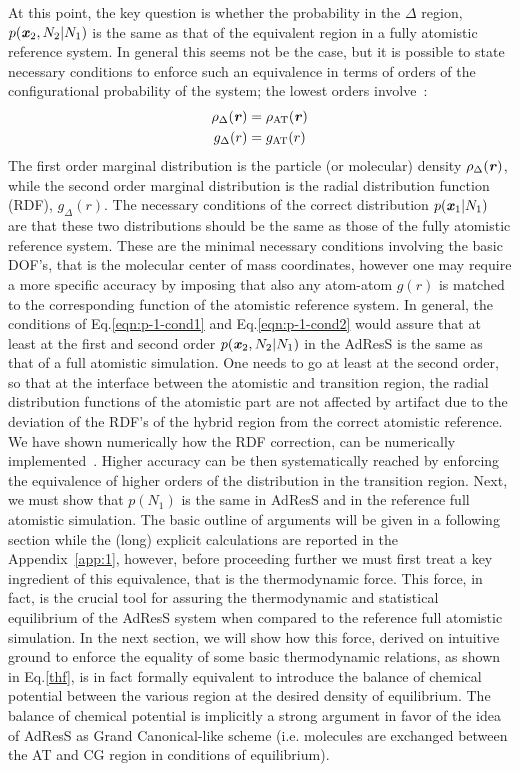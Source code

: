 \documentclass[aip,jcp,a4paper,reprint,onecolumn]{revtex4-1}
\newcommand{\redc}[1]{{\color{red} #1}}
\newcommand{\vect}[1]{\textbf{\textit{#1}}}
\newcommand{\AT}{{\textrm{{AT}}}}
\newcommand{\HY}{{\Delta}}
\begin{document}
\noindent
At this point, the key question is whether the probability in the $\HY$ region, $p(\vect
x_2, N_2 | N_1)$ is the same as that of the equivalent region in a \redc{fully} atomistic reference
system. In general this seems not be the case, but it is possible to
\redc{state} necessary conditions to enforce such an equivalence in terms of orders of the configurational probability of the system; the lowest orders involve~\cite{rdfcorr}:
\begin{align}\label{eqn:p-1-cond1}
  \rho_{\HY}(\vect r) &= \rho_{\AT}(\vect r)\\\label{eqn:p-1-cond2}
  g_{\HY}( r) &= g_{\AT}(r)
\end{align}
The first order marginal distribution is the particle (or molecular) density 
$\rho_{\HY}(\vect r)$, while the second order marginal distribution is
the radial distribution function (RDF), $g_{\HY}(r)$. 
The necessary
conditions of the correct distribution $p(\vect x_1|N_1)$
are that these two distributions should be the same as those of the fully atomistic reference system. 
These are the minimal necessary conditions involving the basic DOF's, that is the molecular center of mass coordinates, however one may require a more specific accuracy by imposing that also any atom-atom $g(r)$ is matched to the corresponding function of the atomistic reference system. 
In general, the conditions of Eq.\ref{eqn:p-1-cond1} and Eq.\ref{eqn:p-1-cond2} would assure that at least at the first and second order $p(\vect x_2, N_2 | N_1)$ in the AdResS is the same as that of a full atomistic simulation. One needs to go at least at the second order, so that at the interface between the atomistic and transition region, the radial distribution functions of the atomistic part are not affected by artifact due to the deviation of the RDF's of the hybrid region from the correct atomistic reference. 
We have shown numerically how the RDF correction, can be numerically implemented~\cite{rdfcorr}.
Higher accuracy can be then systematically reached by enforcing the equivalence of higher orders of the distribution in the transition region.
Next, we must show that $p(N_{1})$ is the same in AdResS and in the reference full atomistic simulation. The basic outline of arguments will be given in a following section while the (long) explicit calculations are reported in the Appendix~\ref{app:1}, however, before proceeding further we must first treat a key ingredient of this equivalence, that is the thermodynamic force. This force, in fact, is the crucial tool for assuring the thermodynamic and statistical equilibrium of the AdResS system when compared to the reference full atomistic simulation. In the next section, we will show how this force, derived on intuitive ground to enforce the equality of some basic thermodynamic relations, as shown in Eq.\ref{thf}, is in fact formally equivalent to introduce the balance of chemical potential between the various region at the desired density of equilibrium. The balance of chemical potential is implicitly a strong argument in favor of the idea of AdResS as Grand Canonical-like scheme (i.e. molecules are exchanged between the AT and CG region in conditions of equilibrium). 
\end{document}
